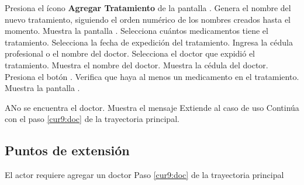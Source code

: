  \begin{UCtrayectoria}
 	
 	\UCpaso [\UCactor] Presiona el ícono \textbf{Agregar Tratamiento} de la pantalla .
 	\UCpaso Genera el nombre del nuevo tratamiento, siguiendo el orden numérico de los nombres creados hasta el momento.
 	\UCpaso Muestra la pantalla .
 	\UCpaso [\UCactor] Selecciona cuántos medicamentos tiene el tratamiento.
 	\UCpaso [\UCactor] Selecciona la fecha de expedición del tratamiento.
 	\UCpaso [\UCactor] Ingresa la cédula profesional o el nombre del doctor.
 	\UCpaso [\UCactor] Selecciona el doctor que expidió el tratamiento.
 	\UCpaso Muestra el nombre del doctor.
 	\UCpaso Muestra la cédula del doctor.
 	\UCpaso [\UCactor] Presiona el botón . \label{cur9:doc}
 	\UCpaso Verifica que haya al menos un medicamento en el tratamiento.
 	\UCpaso Muestra la pantalla .
 	
 	
    
 \end{UCtrayectoria}

\begin{UCtrayectoriaA}{A}{No se encuentra el doctor.}
	\UCpaso Muestra el mensaje 
	\UCpaso Extiende al caso de uso  
	\UCpaso Continúa con el paso \ref{cur9:doc} de la trayectoria principal.
\end{UCtrayectoriaA} 
 



 
\subsection{Puntos de extensión}

\UCExtensionPoint
{El actor requiere agregar un doctor}
{ Paso \ref{cur9:doc} de la trayectoria principal}
{}



